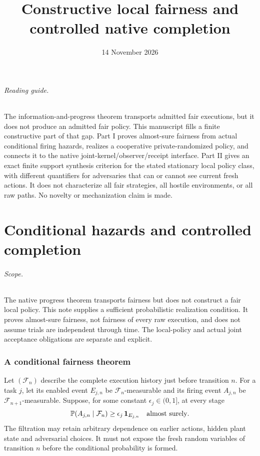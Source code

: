 \documentclass[11pt]{article}
\title{Constructive local fairness and controlled native completion}
\author{}\date{14 November 2026}
\begin{document}
\maketitle
\paragraph{Reading guide.} The information-and-progress theorem transports admitted fair executions, but it does not produce an admitted fair policy. This manuscript fills a finite constructive part of that gap. Part I proves almost-sure fairness from actual conditional firing hazards, realizes a cooperative private-randomized policy, and connects it to the native joint-kernel/observer/receipt interface. Part II gives an exact finite support synthesis criterion for the stated stationary local policy class, with different quantifiers for adversaries that can or cannot see current fresh actions. It does not characterize all fair strategies, all hostile environments, or all raw paths. No novelty or mechanization claim is made.
\part{Conditional hazards and controlled completion}

\paragraph{Scope.} The native progress theorem transports fairness but does not construct a fair local policy. This note supplies a sufficient probabilistic realization condition. It proves almost-sure fairness, not fairness of every raw execution, and does not assume trials are independent through time. The local-policy and actual joint acceptance obligations are separate and explicit.

\section{A conditional fairness theorem}
Let $(\mathcal F_n)$ describe the complete execution history just before transition $n$. For a task $j$, let its enabled event $E_{j,n}$ be $\mathcal F_n$-measurable and its firing event $A_{j,n}$ be $\mathcal F_{n+1}$-measurable. Suppose, for some constant $\epsilon_j\in(0,1]$, at every stage
\[
 {\mathbb P}(A_{j,n}\mid\mathcal F_n)\ge
 \epsilon_j\,{\bf1}_{E_{j,n}}\quad\hbox{almost surely}.
\]
The filtration may retain arbitrary dependence on earlier actions, hidden plant state and adversarial choices. It must not expose the fresh random variables of transition $n$ before the conditional probability is formed.
\end{document}
